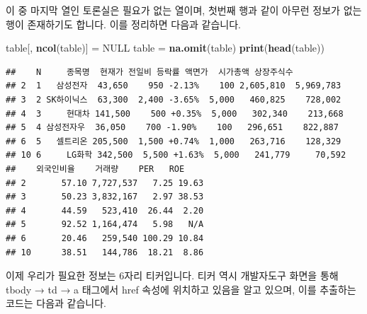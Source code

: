 \documentclass[]{book}
\newenvironment{Shaded}{\begin{snugshade}}{\end{snugshade}}
\newcommand{\DataTypeTok}[1]{\textcolor[rgb]{0.13,0.29,0.53}{#1}}
\newcommand{\DecValTok}[1]{\textcolor[rgb]{0.00,0.00,0.81}{#1}}
\newcommand{\KeywordTok}[1]{\textcolor[rgb]{0.13,0.29,0.53}{\textbf{#1}}}
\newcommand{\NormalTok}[1]{#1}
\newcommand{\OperatorTok}[1]{\textcolor[rgb]{0.81,0.36,0.00}{\textbf{#1}}}
\newcommand{\OtherTok}[1]{\textcolor[rgb]{0.56,0.35,0.01}{#1}}
\newcommand{\StringTok}[1]{\textcolor[rgb]{0.31,0.60,0.02}{#1}}
\begin{document}
이 중 마지막 열인 토론실은 필요가 없는 열이며, 첫번째 행과 같이 아무런 정보가 없는 행이 존재하기도 합니다. 이를 정리하면 다음과 같습니다.

\begin{Shaded}
\begin{Highlighting}[]
\NormalTok{table[, }\KeywordTok{ncol}\NormalTok{(table)] =}\StringTok{ }\OtherTok{NULL}
\NormalTok{table =}\StringTok{ }\KeywordTok{na.omit}\NormalTok{(table)}
\KeywordTok{print}\NormalTok{(}\KeywordTok{head}\NormalTok{(table))}
\end{Highlighting}
\end{Shaded}

\begin{verbatim}
##    N     종목명  현재가 전일비 등락률 액면가  시가총액 상장주식수
## 2  1   삼성전자  43,650    950 -2.13%    100 2,605,810  5,969,783
## 3  2 SK하이닉스  63,300  2,400 -3.65%  5,000   460,825    728,002
## 4  3     현대차 141,500    500 +0.35%  5,000   302,340    213,668
## 5  4 삼성전자우  36,050    700 -1.90%    100   296,651    822,887
## 6  5   셀트리온 205,500  1,500 +0.74%  1,000   263,716    128,329
## 10 6     LG화학 342,500  5,500 +1.63%  5,000   241,779     70,592
##    외국인비율    거래량    PER   ROE
## 2       57.10 7,727,537   7.25 19.63
## 3       50.23 3,832,167   2.97 38.53
## 4       44.59   523,410  26.44  2.20
## 5       92.52 1,164,474   5.98   N/A
## 6       20.46   259,540 100.29 10.84
## 10      38.51   144,786  18.21  8.86
\end{verbatim}

이제 우리가 필요한 정보는 6자리 티커입니다. 티커 역시 개발자도구 화면을 통해 tbody → td → a 태그에서 href 속성에 위치하고 있음을 알고 있으며, 이를 추출하는 코드는 다음과 같습니다.

\begin{Shaded}
\end{Shaded}
\end{document}
